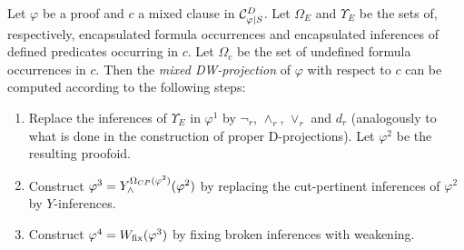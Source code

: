 \begin{definition}
\label{definition:DWProjectionMixed}
Let $\varphi$ be a proof and $c$ a mixed clause in $\mathcal{C}^{D}_{\varphi|S}$. Let $\Omega_E$ and $\Upsilon_E$ be the sets of, respectively, encapsulated formula occurrences and encapsulated inferences of defined predicates occurring in $c$. Let $\Omega_c$ be the set of undefined formula occurrences in $c$. Then the \emph{mixed DW-projection} of $\varphi$ with respect to $c$ can be computed according to the following steps:

\begin{enumerate}
\item Replace the inferences of $\Upsilon_E$ in $\varphi^1$ by $\neg_r$, $\wedge_r$, $\vee_r$ and $d_r$ (analogously to what is done in the construction of proper D-projections). Let $\varphi^2$ be the resulting proofoid.
\item Construct $\varphi^3 = Y_{\wedge}^{\Omega_{CP}(\varphi^2)}(\varphi^2)$ by replacing the cut-pertinent inferences of $\varphi^2$ by $Y$-inferences.
\item Construct $\varphi^4 = W_{\mathrm{fix}}(\varphi^3)$ by fixing broken inferences with weakening.
\end{enumerate}
\end{definition}


